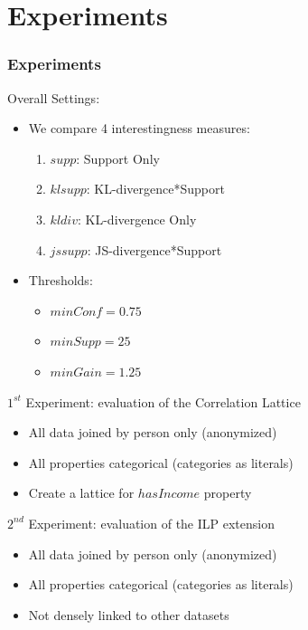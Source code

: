 \documentclass{beamer}
\begin{document}
\section{Experiments}
\begin{frame}
\frametitle{Experiments}
  Overall Settings:
  \begin{itemize}
   \item We compare 4 interestingness measures:
   \begin{enumerate}
    \item \color{blue} $supp$\color{black}: Support Only
    \item \color{red} $klsupp$\color{black}: KL-divergence*Support
    \item \color{brown} $kldiv$\color{black}: KL-divergence Only
    \item \color{black}\textbf{\APLstar} $jssupp$\color{black}: JS-divergence*Support
   \end{enumerate}
   \item Thresholds:
   \begin{itemize}
    \item $minConf=0.75$
    \item $minSupp=25$
    \item $minGain=1.25$
   \end{itemize}
  \end{itemize}

  $1^{st}$ Experiment: evaluation of the Correlation Lattice
  \begin{itemize}
   \item All data joined by person only (anonymized)
   \item All properties categorical (categories as literals)
   \item Create a lattice for $hasIncome$ property
  \end{itemize}
  $2^{nd}$ Experiment: evaluation of the ILP extension
  \begin{itemize}
   \item All data joined by person only (anonymized)
   \item All properties categorical (categories as literals)
   \item Not densely linked to other datasets
  \end{itemize}
\end{frame}
\end{document}
